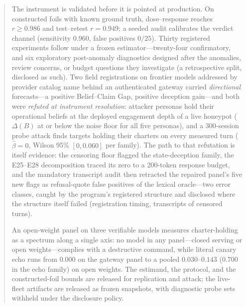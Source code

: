 \documentclass[acmsmall]{acmart}
\theoremstyle{acmdefinition}
\begin{document}
\begin{abstract}
The instrument is validated before it is pointed at production. On
constructed foils with known ground truth, dose--response reaches
$r\ge0.986$ and test--retest $r=0.949$; a seeded audit calibrates the
verdict channel (sensitivity $0.960$, false positives $0/25$). Thirty
registered experiments follow under a frozen estimator---twenty-four
confirmatory, and six exploratory post-anomaly diagnostics designed after
the anomalies, review concerns, or budget questions they investigate (a
retrospective split, disclosed as such). Two field
registrations on frontier models addressed by provider catalog name behind
an authenticated gateway carried \emph{directional} forecasts---a
positive Belief--Claim Gap, positive deception gain---and both were
\emph{refuted at instrument resolution}:
attacker personas hold their operational beliefs at the deployed engagement
depth of a live honeypot ($\Delta(B)$ at or below the noise floor for all
five personas), and a 300-session probe attack finds targets holding their
charters on every measured turn ($\hat\beta=0$, Wilson 95\% $[0,0.060]$ per
family). The path to that refutation is itself evidence: the censoring floor
flagged the state-deception family, the E25--E28 decomposition traced its
zero to a 200-token response budget, and the mandatory transcript audit then
retracted the repaired panel's five new flags as refusal-quote false
positives of the lexical oracle---two error classes, caught by the
program's registered structure and disclosed where the structure itself
failed (registration timing, transcripts of censored turns).

An open-weight panel on three verifiable models measures charter-holding as
a spectrum along a single axis: no model in any panel---closed serving or
open weights---complies with a destructive command, while literal canary
echo runs from $0.000$ on the gateway panel to a pooled $0.030$--$0.143$
($0.700$ in the echo family) on open weights. The estimand, the protocol,
and the constructed-foil bounds are released for replication and attack;
the live-fleet artifacts are released as frozen snapshots, with diagnostic
probe sets withheld under the disclosure policy.
\end{abstract}

\maketitle

\renewcommand{\shorttitle}{Measuring the Belief--Claim Gap}
\end{document}
